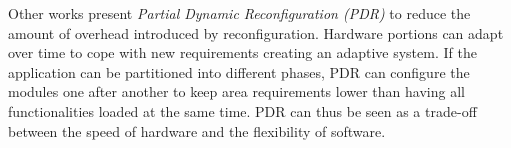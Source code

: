 Other works present \emph{Partial Dynamic Reconfiguration (PDR)} \cite{reconfigurable} to reduce the amount of overhead introduced by reconfiguration. Hardware portions can adapt over time to cope with new requirements creating an adaptive system. If the application can be partitioned into different phases, PDR can configure the modules one after another to keep area requirements lower than having all functionalities loaded at the same time. PDR can thus be seen as a trade-off between the speed of hardware and the flexibility of software.  